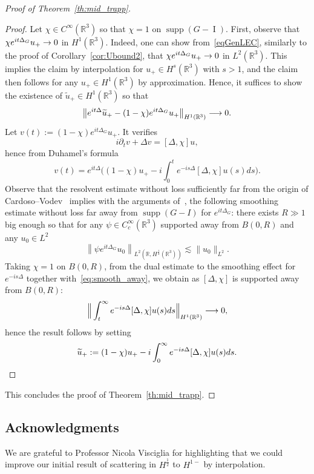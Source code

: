 \documentclass[10pt]{amsart}
\theoremstyle{definition}\newtheorem{defi}[theo]{Definition}\newtheorem{rema}[theo]{Remark}\newtheorem{exam}[theo]{Example}\newtheorem{exem}[theo]{Example}\newtheorem{nota}[theo]{Notation}
\newcommand*\R{\mathbb{R}}
\DeclareMathOperator{\I}{I}
\DeclareMathOperator{\supp}{supp}
\renewcommand*{\to}{\mathchoice{\longrightarrow}{\rightarrow}{\rightarrow}{\rightarrow}}
\begin{document}
\begin{proof}[Proof of Theorem~\ref{th:mid_trapp}]
\begin{proof}
Let $\chi \in C^\infty(\R^3)$ so that $\chi = 1$ on $\supp(G - \I)$. First, observe that $\chi e^{it\Delta_G} u_+ \to 0$ in $H^1(\R^3)$. Indeed, one can show from~\eqref{eqGenLEC}, similarly to the proof of Corollary~\ref{cor:Ubound2}, that $\chi e^{it\Delta_G} u_+ \to 0$ in $L^2(\R^3)$. This implies the claim by interpolation for $u_+ \in H^s(\R^3)$ with $s>1$, and the claim then follows for any $u_+\in H^1(\R ^3)$ by approximation. Hence, it suffices to show the existence of $\widetilde u_+ \in H^1(\R^3)$ so that
\[
\left\| e^{it\Delta}\widetilde u_+ - (1-\chi)e^{it\Delta_G} u_+ \right\|_{H^1(\R^3)} \to 0.
\]
Let $v(t) := (1-\chi)e^{it\Delta_G} u_+$. It verifies
\[
i\partial_t v + \Delta v = [\Delta, \chi] u,
\]
hence from Duhamel's formula
\[
v(t) = e^{it\Delta}\Big((1-\chi) u_+ - i\int_0^t e^{-is\Delta} [\Delta, \chi] u(s) ds \Big).
\]
Observe that the resolvent estimate without loss sufficiently far from the origin of Cardoso--Vodev~\cite{CaVo02} implies with the arguments of~\cite[Proposition~2.7]{BuGeTz04b}, the following smoothing estimate without loss far away from $\supp(G-I)$ for $e^{it\Delta_G}$: there exists $R\gg 1$ big enough so that for any $\psi \in C^\infty_c(\R^3)$ supported away from $B(0, R)$ and any $u_0 \in L^2$
\begin{equation}\label{eq:smooth_away}
\left\| \psi e^{it\Delta_G} u_0\right\|_{L^2\left(\R, H^{\frac 12}(\R ^3)\right)}
\lesssim \| u_0 \|_{L^2}.
\end{equation}
Taking $\chi =1$ on $B(0,R)$, from the dual estimate to the smoothing effect for $e^{-is\Delta}$ together with~\eqref{eq:smooth_away}, we obtain as $[\Delta, \chi]$ is supported away from $B(0,R)$:
\[
\Big\| \int_t^\infty e^{-is\Delta} [\Delta, \chi] u(s) ds \Big\|_{H^1(\R^3) }\to 0,
\]
hence the result follows by setting
\[
\widetilde u_+ := (1-\chi) u_+ - i\int_0^\infty e^{-is\Delta} [\Delta, \chi] u(s) ds.\qedhere
\]
\end{proof}

This concludes the proof of Theorem~\ref{th:mid_trapp}.
\end{proof}
\subsection*{Acknowledgments} We are grateful to Professor Nicola Visciglia for highlighting that we could improve our initial result of scattering in $H^{\frac 12}$ to $H^{1-}$ by interpolation.
\end{document}
